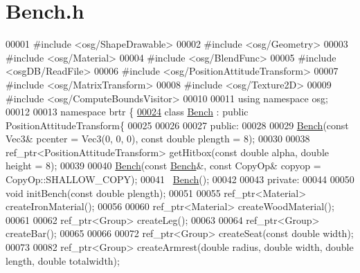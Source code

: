 \hypertarget{_bench_8h_source}{\section{Bench.\+h}
\label{_bench_8h_source}
}

\begin{DoxyCode}
00001 \textcolor{preprocessor}{#include <osg/ShapeDrawable>}
00002 \textcolor{preprocessor}{#include <osg/Geometry>}
00003 \textcolor{preprocessor}{#include <osg/Material>}
00004 \textcolor{preprocessor}{#include <osg/BlendFunc>}
00005 \textcolor{preprocessor}{#include <osgDB/ReadFile>}
00006 \textcolor{preprocessor}{#include <osg/PositionAttitudeTransform>}
00007 \textcolor{preprocessor}{#include <osg/MatrixTransform>}
00008 \textcolor{preprocessor}{#include <osg/Texture2D>}
00009 \textcolor{preprocessor}{#include <osg/ComputeBoundsVisitor>}
00010 
00011 \textcolor{keyword}{using namespace }osg;
00012 
00013 \textcolor{keyword}{namespace }brtr \{
\hypertarget{_bench_8h_source_l00024}{}\hyperlink{classbrtr_1_1_bench}{00024}     \textcolor{keyword}{class }\hyperlink{classbrtr_1_1_bench}{Bench} : \textcolor{keyword}{public} PositionAttitudeTransform\{
00025     
00026           
00027       \textcolor{keyword}{public}:
00028           
00029           \hyperlink{classbrtr_1_1_bench}{Bench}(\textcolor{keyword}{const} Vec3& pcenter = Vec3(0, 0, 0), \textcolor{keyword}{const} \textcolor{keywordtype}{double} plength = 8);
00030 
00038           ref\_ptr<PositionAttitudeTransform> getHitbox(\textcolor{keyword}{const} \textcolor{keywordtype}{double} alpha, \textcolor{keywordtype}{double} height = 8);
00039       
00040           \hyperlink{classbrtr_1_1_bench}{Bench}(\textcolor{keyword}{const} \hyperlink{classbrtr_1_1_bench}{Bench}&, \textcolor{keyword}{const} CopyOp& copyop = CopyOp::SHALLOW\_COPY);
00041           ~\hyperlink{classbrtr_1_1_bench}{Bench}();
00042       
00043       \textcolor{keyword}{private}:
00044       
00050       \textcolor{keywordtype}{void} initBench(\textcolor{keyword}{const} \textcolor{keywordtype}{double} plength);
00051       
00055       ref\_ptr<Material> createIronMaterial();
00056       
00060       ref\_ptr<Material> createWoodMaterial();
00061       
00062       ref\_ptr<Group> createLeg();
00063       
00064       ref\_ptr<Group> createBar();
00065       
00066       
00072       ref\_ptr<Group> createSeat(\textcolor{keyword}{const} \textcolor{keywordtype}{double} width);
00073       
00082       ref\_ptr<Group> createArmrest(\textcolor{keywordtype}{double} radius, \textcolor{keywordtype}{double} width, \textcolor{keywordtype}{double} length, \textcolor{keywordtype}{double} totalwidth);

\end{DoxyCode}
